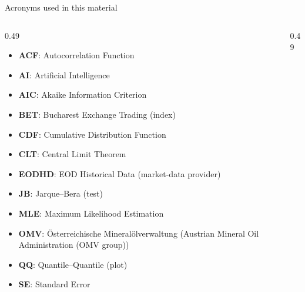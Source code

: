 {
\begin{frame}[noframenumbering]
    \titlepage
\end{frame}
}
\begin{frame}{Acronyms used in this material}
\begin{columns}[T]
\begin{column}{0.49\textwidth}
\begin{itemize}\setlength{\itemsep}{0pt}
    \item \textbf{ACF}: Autocorrelation Function
    \item \textbf{AI}: Artificial Intelligence
    \item \textbf{AIC}: Akaike Information Criterion
    \item \textbf{BET}: Bucharest Exchange Trading (index)
    \item \textbf{CDF}: Cumulative Distribution Function
    \item \textbf{CLT}: Central Limit Theorem
    \item \textbf{EODHD}: EOD Historical Data (market-data provider)
    \item \textbf{JB}: Jarque–Bera (test)
    \item \textbf{MLE}: Maximum Likelihood Estimation
    \item \textbf{OMV}: Österreichische Mineralölverwaltung (Austrian Mineral Oil Administration (OMV group))
    \item \textbf{QQ}: Quantile–Quantile (plot)
    \item \textbf{SE}: Standard Error
\end{itemize}
\end{column}
\begin{column}{0.49\textwidth}
\end{column}
\end{columns}
\end{frame}

